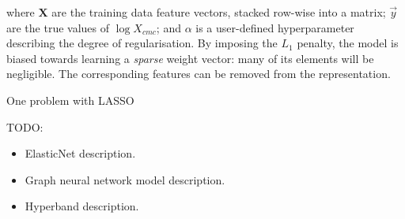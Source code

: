 where $\mathbf{X}$ are the training data feature vectors, stacked row-wise into
a matrix; $\vec{y}$ are the true values of $\log X_{cmc}$; and $\alpha$ is a
user-defined hyperparameter describing the degree of regularisation. By imposing
the $L_1$ penalty, the model is biased towards learning a \emph{sparse} weight
vector: many of its elements will be negligible. The corresponding features can
be removed from the representation.

One problem with LASSO 

TODO:
\begin{itemize}
    \item ElasticNet description.
    \item Graph neural network model description.
    \item Hyperband description.
\end{itemize}